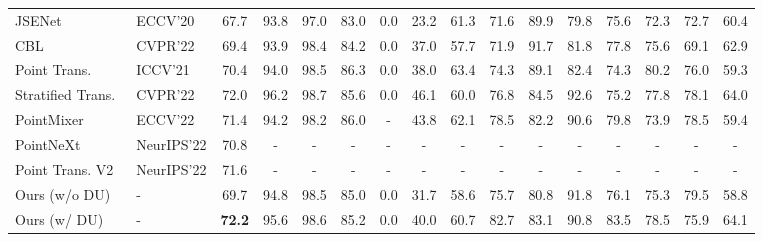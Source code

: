 \documentclass[a4paper,fleqn]{cas-dc}
\begin{document}
\begin{table*}[t]
\begin{tabular*}{\tblwidth}{L|L|C|CCCCCCCCCCCCC}
JSENet~\cite{hu2020jsenet}
        & ECCV'20
        & 67.7
        & 93.8
        & 97.0
        & 83.0
        & 0.0
        & 23.2
        & 61.3
        & 71.6
        & 89.9
        & 79.8
        & 75.6
        & 72.3
        & 72.7
        & 60.4
        \\
CBL~\cite{tang2022contrastive}
        & CVPR'22
        & 69.4
        & 93.9
        & 98.4
        & 84.2
        & 0.0
        & 37.0 
        & 57.7
        & 71.9
        & 91.7
        & 81.8
        & 77.8
        & 75.6
        & 69.1
        & 62.9  
        \\
        Point Trans.~\cite{zhao2021point}
        & ICCV'21
        &70.4
        & 94.0
        & 98.5
        & 86.3
& 0.0
        &38.0 
        &63.4
&74.3
        & 89.1
        & 82.4 
        & 74.3
        & 80.2
& 76.0
& 59.3
        \\
        Stratified Trans.~\cite{lai2022stratified}
        & CVPR'22
        &72.0
        & 96.2 
& 98.7
& 85.6
& 0.0
        & 46.1
& 60.0
        & 76.8
        & 84.5
        & 92.6
& 75.2
        & 77.8
        & 78.1
& 64.0
\\
        PointMixer~\cite{choe2022pointmixer}
        & ECCV'22
        & 71.4
        & 94.2 
& 98.2
& 86.0
& -
        & 43.8
& 62.1
        & 78.5
        & 82.2
        & 90.6
& 79.8
        & 73.9
        & 78.5
& 59.4
\\
        PointNeXt~\cite{qian2022pointnext}
        & NeurIPS'22
        & 70.8
        &-&-&-&-&-&-&-&-&-&-&-&-&-
        \\
        Point Trans. V2~\cite{wu2022pointv2}
        & NeurIPS'22
        & 71.6
        &-&-&-&-&-&-&-&-&-&-&-&-&-
        \\
\midrule
Ours (w/o DU)
        & -
        & 69.7
        & 94.8
        & 98.5
        & 85.0
        & 0.0
        & 31.7
        & 58.6
        & 75.7
        & 80.8
        & 91.8
        & 76.1
        & 75.3
        & 79.5
        & 58.8
        \\
Ours (w/ DU)
        & -
        & \textbf{72.2}
        & 95.6
& 98.6
& 85.2
        & 0.0
        & 40.0
& 60.7
& 82.7
& 83.1
        & 90.8
& 83.5
& 78.5
& 75.9
        & 64.1
\\
\bottomrule
\end{tabular*}
    
    \label{tab: result of scene segmentation}
\end{table*}
\end{document}
